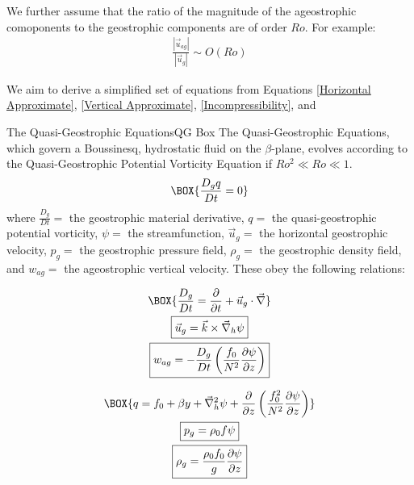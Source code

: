 We further assume that the ratio of the magnitude of the ageostrophic comoponents to the geostrophic components are of order $Ro$. For example:
\begin{align*}
    \frac{\left|\vec{u}_{ag}\right|}{\left|\vec{u}_g\right|}\sim O (Ro)
\end{align*}

We aim to derive a simplified set of equations from Equations \ref{Horizontal Approximate}, \ref{Vertical Approximate}, \ref{Incompressibility}, and 

\begin{fact}{The Quasi-Geostrophic Equations}{QG Box}\label{QG Box}
    The Quasi-Geostrophic Equations, which govern a Boussinesq, hydrostatic fluid on the $\beta$-plane, evolves according to the Quasi-Geostrophic Potential Vorticity Equation if $Ro^2\ll Ro \ll 1$.
    \begin{gather}
        \label{QGPV Cons}
        \BOX{
            \frac{D_g q}{Dt} = 0
        }
    \end{gather}
    where $\frac{D_g}{Dt}=$ the geostrophic material derivative, $q=$ the quasi-geostrophic potential vorticity, $\psi=$ the streamfunction, $\vec{u}_g=$ the horizontal geostrophic velocity, $p_g=$ the geostrophic pressure field, $\rho_g=$ the geostrophic density field, and $w_{ag}=$ the ageostrophic vertical velocity. These obey the following relations:

    \begin{minipage}{0.42\linewidth}
        \begin{gather}
            \label{Geostrophic MD}
            \BOX{
                \frac{D_g}{Dt}=\frac{\partial }{\partial t}+ \vec{u}_g\cdot\vec{\nabla}
            }
            \\
            \label{Streamfct}
            \boxed{\vec{u}_g = \vec{k}\times\vec{\nabla}_h\psi}
            \\
            \label{wag}
            \boxed{w_{ag}=-\frac{D_g}{Dt}\left( \frac{f_0}{N^2} \frac{\partial \psi}{\partial z}\right)}
        \end{gather}
    \end{minipage}
    \hfill
    \begin{minipage}{0.56\linewidth}
        \begin{gather}
            \label{QGPV}
            \BOX{
                q=f_0+\beta y + \vec{\nabla}_h^2 \psi + \frac{\partial }{\partial z}\left( \frac{f_0^2}{N^2} \frac{\partial \psi}{\partial z} \right)
            }
            \\
            \label{p QGPV}
            \boxed{p_g = \rho_0 f \psi}
            \\
            \label{rho QGPV}
            \boxed{\rho_g = \frac{\rho_0 f_0}{g}\frac{\partial \psi}{\partial z}}
        \end{gather}
    \end{minipage}

\end{fact}

